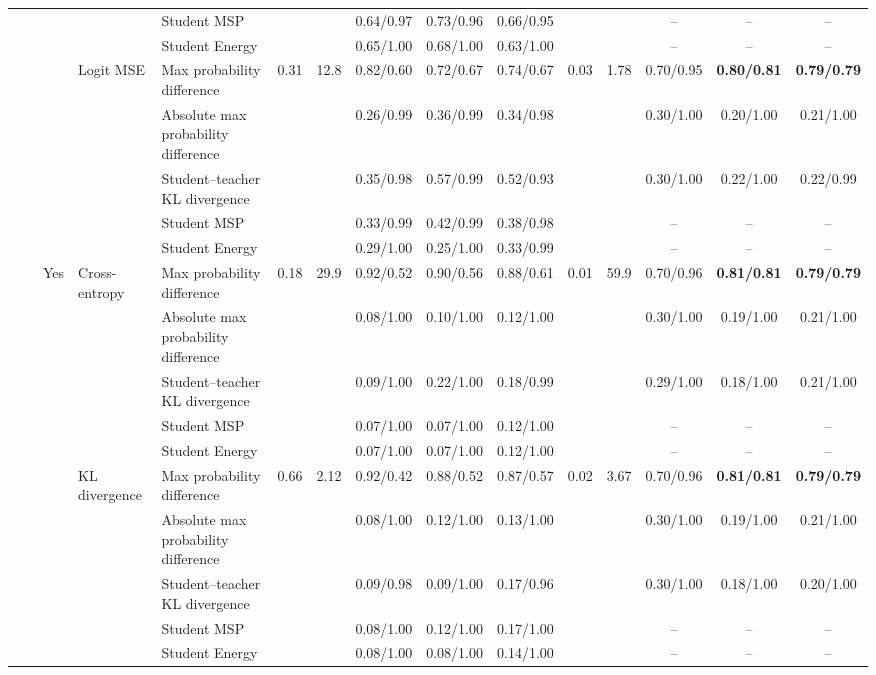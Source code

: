 \documentclass[border=2pt]{standalone}
\begin{document}
\begin{tabular}{lllllcccccccccc}
 &  &  &  & Student MSP &  &  & 0.64/0.97 & 0.73/0.96 & 0.66/0.95 &  &  & -- & -- & -- \\
 &  &  &  & Student Energy &  &  & 0.65/1.00 & 0.68/1.00 & 0.63/1.00 &  &  & -- & -- & -- \\
 &  &  & Logit MSE & Max probability difference & 0.31 & 12.8 & 0.82/0.60 & 0.72/0.67 & 0.74/0.67 & 0.03 & 1.78 & 0.70/0.95 & \textbf{0.80/0.81} & \textbf{0.79/0.79} \\
 &  &  &  & Absolute max probability difference &  &  & 0.26/0.99 & 0.36/0.99 & 0.34/0.98 &  &  & 0.30/1.00 & 0.20/1.00 & 0.21/1.00 \\
 &  &  &  & Student--teacher KL divergence &  &  & 0.35/0.98 & 0.57/0.99 & 0.52/0.93 &  &  & 0.30/1.00 & 0.22/1.00 & 0.22/0.99 \\
 &  &  &  & Student MSP &  &  & 0.33/0.99 & 0.42/0.99 & 0.38/0.98 &  &  & -- & -- & -- \\
 &  &  &  & Student Energy &  &  & 0.29/1.00 & 0.25/1.00 & 0.33/0.99 &  &  & -- & -- & -- \\
 &  & Yes & Cross-entropy & Max probability difference & 0.18 & 29.9 & 0.92/0.52 & 0.90/0.56 & 0.88/0.61 & 0.01 & 59.9 & 0.70/0.96 & \textbf{0.81/0.81} & \textbf{0.79/0.79} \\
 &  &  &  & Absolute max probability difference &  &  & 0.08/1.00 & 0.10/1.00 & 0.12/1.00 &  &  & 0.30/1.00 & 0.19/1.00 & 0.21/1.00 \\
 &  &  &  & Student--teacher KL divergence &  &  & 0.09/1.00 & 0.22/1.00 & 0.18/0.99 &  &  & 0.29/1.00 & 0.18/1.00 & 0.21/1.00 \\
 &  &  &  & Student MSP &  &  & 0.07/1.00 & 0.07/1.00 & 0.12/1.00 &  &  & -- & -- & -- \\
 &  &  &  & Student Energy &  &  & 0.07/1.00 & 0.07/1.00 & 0.12/1.00 &  &  & -- & -- & -- \\
 &  &  & KL divergence & Max probability difference & 0.66 & 2.12 & 0.92/0.42 & 0.88/0.52 & 0.87/0.57 & 0.02 & 3.67 & 0.70/0.96 & \textbf{0.81/0.81} & \textbf{0.79/0.79} \\
 &  &  &  & Absolute max probability difference &  &  & 0.08/1.00 & 0.12/1.00 & 0.13/1.00 &  &  & 0.30/1.00 & 0.19/1.00 & 0.21/1.00 \\
 &  &  &  & Student--teacher KL divergence &  &  & 0.09/0.98 & 0.09/1.00 & 0.17/0.96 &  &  & 0.30/1.00 & 0.18/1.00 & 0.20/1.00 \\
 &  &  &  & Student MSP &  &  & 0.08/1.00 & 0.12/1.00 & 0.17/1.00 &  &  & -- & -- & -- \\
 &  &  &  & Student Energy &  &  & 0.08/1.00 & 0.08/1.00 & 0.14/1.00 &  &  & -- & -- & -- \\

\end{tabular}
\end{document}
